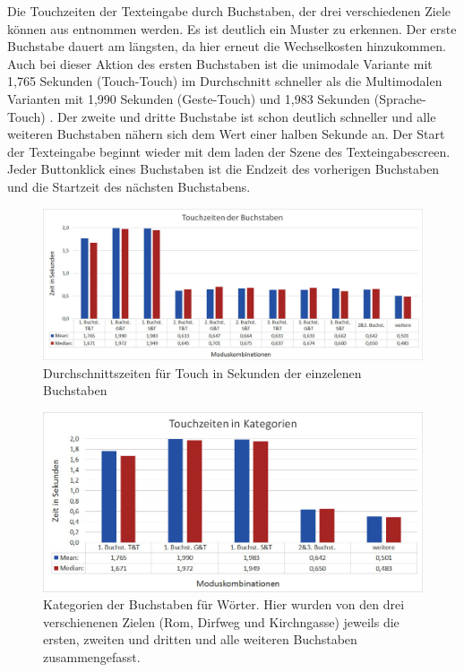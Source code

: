 Die Touchzeiten der Texteingabe durch Buchstaben, der drei verschiedenen Ziele können aus  entnommen werden. Es ist deutlich ein Muster zu erkennen. Der erste Buchstabe dauert am längsten, da hier erneut die Wechselkosten hinzukommen. Auch bei dieser Aktion des ersten Buchstaben ist die unimodale Variante mit 1,765 Sekunden (Touch-Touch) im Durchschnitt schneller als die Multimodalen Varianten mit 1,990 Sekunden (Geste-Touch) und 1,983 Sekunden (Sprache-Touch) . Der zweite und dritte Buchstabe ist schon deutlich schneller und alle weiteren Buchstaben nähern sich dem Wert einer halben Sekunde an. Der Start der Texteingabe beginnt wieder mit dem laden der Szene des Texteingabescreen. Jeder Buttonklick eines Buchstaben ist die Endzeit des vorherigen Buchstaben und die Startzeit des nächsten Buchstabens.
\begin{figure}[ht]
  \centering
  \includegraphics[width=1\textwidth]{img/TouchzeitenBuchstabenGesamt.jpg}
  \caption{Durchschnittszeiten für Touch in Sekunden der einzelenen Buchstaben}
  \label{fig:TouchzeitenB_Ges}
\end{figure}
\begin{figure}[ht]
  \centering
  \includegraphics[width=1\textwidth]{img/TouchzeitenKategorien.JPG}
  \caption[Kategorien der Buchstaben für Wörter.]{Kategorien der Buchstaben für Wörter. Hier wurden von den drei verschienenen Zielen (Rom, Dirfweg und Kirchngasse) jeweils die ersten, zweiten und dritten und alle weiteren Buchstaben zusammengefasst.}
  \label{fig:Kategorien}
\end{figure} 

